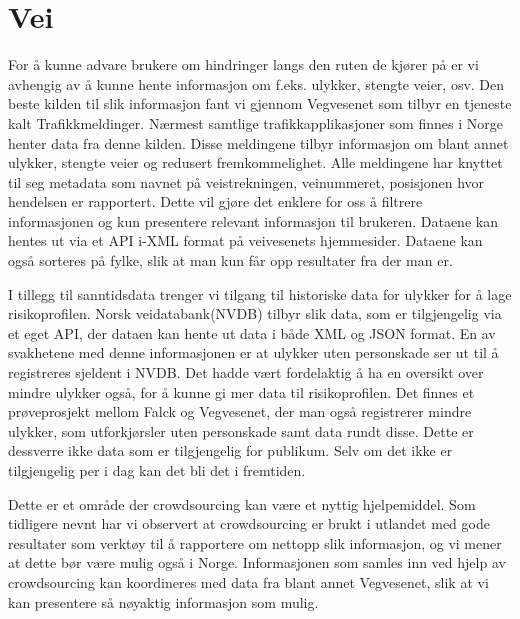 \documentclass[a4paper,norsk,oneside]{book}
\begin{document}
\section{Vei}
For å kunne advare brukere om hindringer langs den ruten de kjører på er vi avhengig av å kunne hente informasjon om f.eks. ulykker, stengte veier, osv. Den beste kilden til slik informasjon fant vi gjennom Vegvesenet som tilbyr en tjeneste kalt Trafikkmeldinger. Nærmest samtlige trafikkapplikasjoner som finnes i Norge henter data fra denne kilden. Disse meldingene tilbyr informasjon om blant annet ulykker, stengte veier og redusert fremkommelighet. Alle meldingene har knyttet til seg metadata som navnet på veistrekningen, veinummeret, posisjonen hvor hendelsen er rapportert. Dette vil gjøre det enklere for oss å filtrere informasjonen og kun presentere relevant informasjon til brukeren. Dataene kan hentes ut via et API i-XML format på veivesenets hjemmesider. Dataene kan også sorteres på fylke, slik at man kun får opp resultater fra der man er.

I tillegg til sanntidsdata trenger vi tilgang til historiske data for ulykker for å lage risikoprofilen. Norsk veidatabank(NVDB) tilbyr slik data, som er tilgjengelig via et eget API, der dataen kan hente ut data i både XML og JSON format.\cite{nve} En av svakhetene med denne informasjonen er at ulykker uten personskade ser ut til å registreres sjeldent i NVDB. Det hadde vært fordelaktig å ha en oversikt over mindre ulykker også, for å kunne gi mer data til risikoprofilen. Det finnes et prøveprosjekt mellom Falck og Vegvesenet, der man også registrerer mindre ulykker, som utforkjørsler uten personskade samt data rundt disse. Dette er dessverre ikke data som er tilgjengelig for publikum. Selv om det ikke er tilgjengelig per i dag kan det bli det i fremtiden.

Dette er et område der crowdsourcing kan være et nyttig hjelpemiddel. Som tidligere nevnt har vi observert at crowdsourcing er brukt i utlandet med gode resultater som verktøy til å rapportere om nettopp slik informasjon, og vi mener at dette bør være mulig også i Norge. Informasjonen som samles inn ved hjelp av crowdsourcing kan koordineres med data fra blant annet Vegvesenet, slik at vi kan presentere så nøyaktig informasjon som mulig. 
\end{document}
